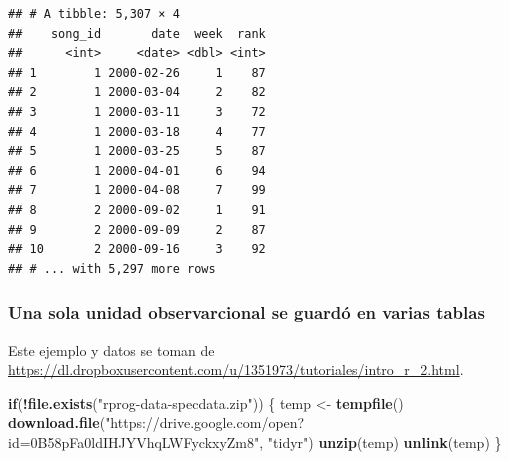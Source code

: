 \documentclass[]{article}
\newenvironment{Shaded}{\begin{snugshade}}{\end{snugshade}}
\newcommand{\KeywordTok}[1]{\textcolor[rgb]{0.13,0.29,0.53}{\textbf{#1}}}
\newcommand{\StringTok}[1]{\textcolor[rgb]{0.31,0.60,0.02}{#1}}
\newcommand{\ControlFlowTok}[1]{\textcolor[rgb]{0.13,0.29,0.53}{\textbf{#1}}}
\newcommand{\OperatorTok}[1]{\textcolor[rgb]{0.81,0.36,0.00}{\textbf{#1}}}
\newcommand{\NormalTok}[1]{#1}
\begin{document}
\begin{Shaded}
\end{Shaded}

\begin{verbatim}
## # A tibble: 5,307 × 4
##    song_id       date  week  rank
##      <int>     <date> <dbl> <int>
## 1        1 2000-02-26     1    87
## 2        1 2000-03-04     2    82
## 3        1 2000-03-11     3    72
## 4        1 2000-03-18     4    77
## 5        1 2000-03-25     5    87
## 6        1 2000-04-01     6    94
## 7        1 2000-04-08     7    99
## 8        2 2000-09-02     1    91
## 9        2 2000-09-09     2    87
## 10       2 2000-09-16     3    92
## # ... with 5,297 more rows
\end{verbatim}

\subsubsection{Una sola unidad observarcional se guardó en varias
tablas}\label{una-sola-unidad-observarcional-se-guardo-en-varias-tablas}

Este ejemplo y datos se toman de
\url{https://dl.dropboxusercontent.com/u/1351973/tutoriales/intro_r_2.html}.

\begin{Shaded}
\begin{Highlighting}[]
\ControlFlowTok{if}\NormalTok{(}\OperatorTok{!}\KeywordTok{file.exists}\NormalTok{(}\StringTok{"rprog-data-specdata.zip"}\NormalTok{)) \{}
\NormalTok{        temp <-}\StringTok{ }\KeywordTok{tempfile}\NormalTok{()}
        \KeywordTok{download.file}\NormalTok{(}\StringTok{"https://drive.google.com/open?id=0B58pFa0ldIHJYVhqLWFyckxyZm8"}\NormalTok{, }\StringTok{"tidyr"}\NormalTok{)}
        \KeywordTok{unzip}\NormalTok{(temp)}
        \KeywordTok{unlink}\NormalTok{(temp)}
\NormalTok{\}}
\end{Highlighting}
\end{Shaded}
\end{document}
